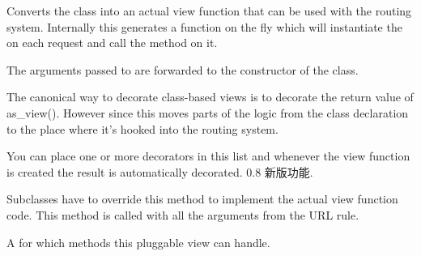 \documentclass[a4paper,12pt]{sphinxmanual}
\begin{document}
\begin{fulllineitems}
\begin{fulllineitems}
\label{api:flask.views.View.as_view}
Converts the class into an actual view function that can be used
with the routing system.  Internally this generates a function on the
fly which will instantiate the  on each request and call
the  method on it.

The arguments passed to  are forwarded to the
constructor of the class.

\end{fulllineitems}


\begin{fulllineitems}
\label{api:flask.views.View.decorators}
The canonical way to decorate class-based views is to decorate the
return value of as\_view().  However since this moves parts of the
logic from the class declaration to the place where it's hooked
into the routing system.

You can place one or more decorators in this list and whenever the
view function is created the result is automatically decorated.
0.8 新版功能.
\end{fulllineitems}


\begin{fulllineitems}
\label{api:flask.views.View.dispatch_request}
Subclasses have to override this method to implement the
actual view function code.  This method is called with all
the arguments from the URL rule.

\end{fulllineitems}


\begin{fulllineitems}
\label{api:flask.views.View.methods}
A for which methods this pluggable view can handle.

\end{fulllineitems}


\end{fulllineitems}
\end{document}
